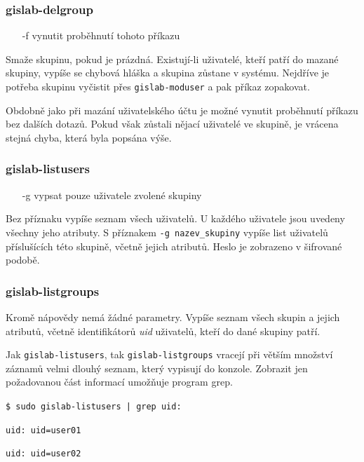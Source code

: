 \subsubsection{gislab-delgroup}
\begin{itemize}
\item [-f] vynutit proběhnutí tohoto příkazu
\end{itemize}
Smaže skupinu, pokud je prázdná. Existují-li uživatelé, kteří patří do mazané skupiny, vypíše se chybová hláška a skupina zůstane v systému. Nejdříve je potřeba skupinu vyčistit přes \texttt{gislab-moduser} a pak příkaz zopakovat.

Obdobně jako při mazání uživatelského účtu je možné vynutit proběhnutí příkazu bez dalších dotazů. Pokud však zůstali nějací uživatelé ve skupině, je vrácena stejná chyba, která byla popsána výše.

\subsubsection{gislab-listusers}
\begin{itemize}
\item [-g] vypsat pouze uživatele zvolené skupiny
\end{itemize}
Bez příznaku vypíše seznam všech uživatelů. U každého uživatele jsou uvedeny všechny jeho atributy. S příznakem \texttt{-g nazev\_skupiny} vypíše list uživatelů příslušících této skupině, včetně jejich atributů. Heslo je zobrazeno v šifrované podobě. 

\subsubsection{gislab-listgroups}
Kromě nápovědy nemá žádné parametry. Vypíše seznam všech skupin a jejich atributů, včetně identifikátorů \textit{uid} uživatelů, kteří do dané skupiny patří. 

Jak \texttt{gislab-listusers}, tak \texttt{gislab-listgroups} vracejí při větším množství záznamů velmi dlouhý seznam, který vypisují do konzole. Zobrazit jen požadovanou část informací umožňuje program grep.

\texttt{\$ sudo gislab-listusers | grep uid:}

\texttt{uid: uid=user01}

\texttt{uid: uid=user02}

